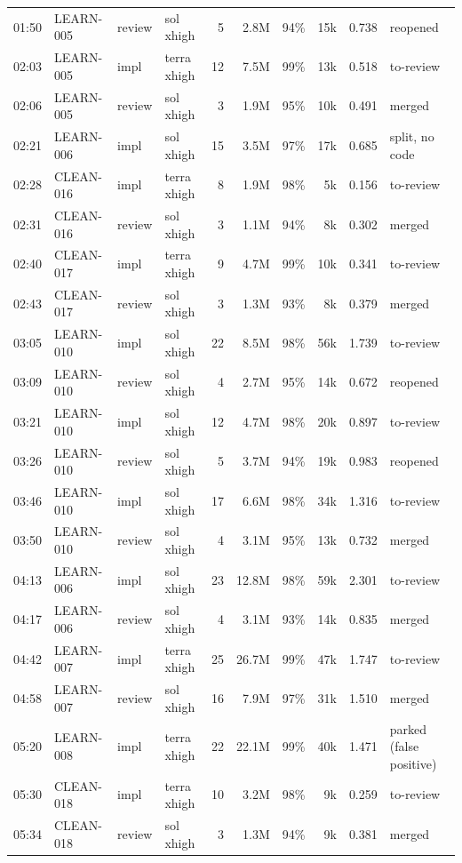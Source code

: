 \documentclass[11pt,a4paper]{article}
\begin{document}
{\begin{longtable}{@{}llllrrrrrl@{}}
01:50 & LEARN-005 & review & sol xhigh & 5 & 2.8M & 94\% & 15k & 0.738 & reopened \\
02:03 & LEARN-005 & impl & terra xhigh & 12 & 7.5M & 99\% & 13k & 0.518 & to-review \\
02:06 & LEARN-005 & review & sol xhigh & 3 & 1.9M & 95\% & 10k & 0.491 & merged \\
02:21 & LEARN-006 & impl & sol xhigh & 15 & 3.5M & 97\% & 17k & 0.685 & split, no code \\
02:28 & CLEAN-016 & impl & terra xhigh & 8 & 1.9M & 98\% & 5k & 0.156 & to-review \\
02:31 & CLEAN-016 & review & sol xhigh & 3 & 1.1M & 94\% & 8k & 0.302 & merged \\
02:40 & CLEAN-017 & impl & terra xhigh & 9 & 4.7M & 99\% & 10k & 0.341 & to-review \\
02:43 & CLEAN-017 & review & sol xhigh & 3 & 1.3M & 93\% & 8k & 0.379 & merged \\
03:05 & LEARN-010 & impl & sol xhigh & 22 & 8.5M & 98\% & 56k & 1.739 & to-review \\
03:09 & LEARN-010 & review & sol xhigh & 4 & 2.7M & 95\% & 14k & 0.672 & reopened \\
03:21 & LEARN-010 & impl & sol xhigh & 12 & 4.7M & 98\% & 20k & 0.897 & to-review \\
03:26 & LEARN-010 & review & sol xhigh & 5 & 3.7M & 94\% & 19k & 0.983 & reopened \\
03:46 & LEARN-010 & impl & sol xhigh & 17 & 6.6M & 98\% & 34k & 1.316 & to-review \\
03:50 & LEARN-010 & review & sol xhigh & 4 & 3.1M & 95\% & 13k & 0.732 & merged \\
04:13 & LEARN-006 & impl & sol xhigh & 23 & 12.8M & 98\% & 59k & 2.301 & to-review \\
04:17 & LEARN-006 & review & sol xhigh & 4 & 3.1M & 93\% & 14k & 0.835 & merged \\
04:42 & LEARN-007 & impl & terra xhigh & 25 & 26.7M & 99\% & 47k & 1.747 & to-review \\
04:58 & LEARN-007 & review & sol xhigh & 16 & 7.9M & 97\% & 31k & 1.510 & merged \\
05:20 & LEARN-008 & impl & terra xhigh & 22 & 22.1M & 99\% & 40k & 1.471 & parked (false positive) \\
05:30 & CLEAN-018 & impl & terra xhigh & 10 & 3.2M & 98\% & 9k & 0.259 & to-review \\
05:34 & CLEAN-018 & review & sol xhigh & 3 & 1.3M & 94\% & 9k & 0.381 & merged \\

\end{longtable}}
\end{document}
